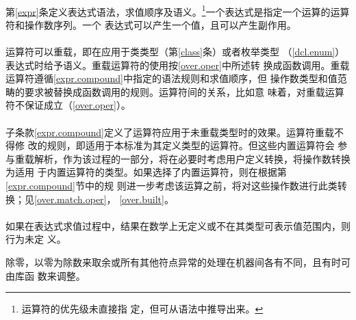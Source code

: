 \paragraph{} %
\begin{note}
  第\ref{expr}条定义表达式语法，求值顺序及语义。\footnote{运算符的优先级未直接指
  定，但可从语法中推导出来。}一个表达式是指定一个运算的运算符和操作数序列。一个
  表达式可以产生一个值，且可以产生副作用。
\end{note}

\paragraph{} %
\begin{note}
  运算符可以重载，即在应用于类类型（第\ref{class}条）或者枚举类型
  （\ref{dcl.enum}）表达式时给予语义。重载运算符的使用按\ref{over.oper}中所述转
  换成函数调用。重载运算符遵循\ref{expr.compound}中指定的语法规则和求值顺序，但
  操作数类型和值范畴的要求被替换成函数调用的规则。运算符间的关系，比如意
  味着，对重载运算符不保证成立（\ref{over.oper}）。
\end{note}

\paragraph{} %
子条款\ref{expr.compound}定义了运算符应用于未重载类型时的效果。运算符重载不得修
改的规则，即适用于本标准为其定义类型的运算符。但这些内置运算符会
参与重载解析，作为该过程的一部分，将在必要时考虑用户定义转换，将操作数转换为适用
于内置运算符的类型。如果选择了内置运算符，则在根据第\ref{expr.compound}节中的规
则进一步考虑该运算之前，将对这些操作数进行此类转换；见\ref{over.match.oper}，
\ref{over.built}。

\paragraph{} %
如果在表达式求值过程中，结果在数学上无定义或不在其类型可表示值范围内，则行为未定
义。

\begin{note}
  除零，以零为除数来取余或所有其他符点异常的处理在机器间各有不同，且有时可由库函
  数来调整。
\end{note}

